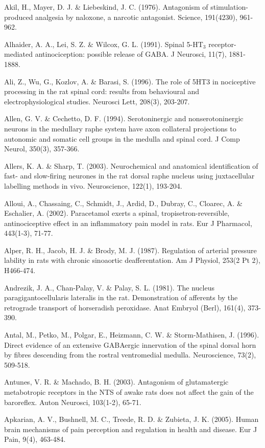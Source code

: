 \documentclass[a4paper,12pt,twoside]{report}
\begin{document}
\begin{singlespacing}
\begin{footnotesize}
Akil, H., Mayer, D. J. \& Liebeskind, J. C. (1976). Antagonism of stimulation-produced analgesia by naloxone, a narcotic antagonist. Science, 191(4230), 961-962.

Alhaider, A. A., Lei, S. Z. \& Wilcox, G. L. (1991). Spinal 5-HT$_{3}$ receptor-mediated antinociception: possible release of GABA. J Neurosci, 11(7), 1881-1888.

Ali, Z., Wu, G., Kozlov, A. \& Barasi, S. (1996). The role of 5HT3 in nociceptive processing in the rat spinal cord: results from behavioural and electrophysiological studies. Neurosci Lett, 208(3), 203-207.

Allen, G. V. \& Cechetto, D. F. (1994). Serotoninergic and nonserotoninergic neurons in the medullary raphe system have axon collateral projections to autonomic and somatic cell groups in the medulla and spinal cord. J Comp Neurol, 350(3), 357-366.

Allers, K. A. \& Sharp, T. (2003). Neurochemical and anatomical identification of fast- and slow-firing neurones in the rat dorsal raphe nucleus using juxtacellular labelling methods in vivo. Neuroscience, 122(1), 193-204.

Alloui, A., Chassaing, C., Schmidt, J., Ardid, D., Dubray, C., Cloarec, A. \& Eschalier, A. (2002). Paracetamol exerts a spinal, tropisetron-reversible, antinociceptive effect in an inflammatory pain model in rats. Eur J Pharmacol, 443(1-3), 71-77.

Alper, R. H., Jacob, H. J. \& Brody, M. J. (1987). Regulation of arterial pressure lability in rats with chronic sinoaortic deafferentation. Am J Physiol, 253(2 Pt 2), H466-474.

Andrezik, J. A., Chan-Palay, V. \& Palay, S. L. (1981). The nucleus paragigantocellularis lateralis in the rat. Demonstration of afferents by the retrograde transport of horseradish peroxidase. Anat Embryol (Berl), 161(4), 373-390.

Antal, M., Petko, M., Polgar, E., Heizmann, C. W. \& Storm-Mathisen, J. (1996). Direct evidence of an extensive GABAergic innervation of the spinal dorsal horn by fibres descending from the rostral ventromedial medulla. Neuroscience, 73(2), 509-518.

Antunes, V. R. \& Machado, B. H. (2003). Antagonism of glutamatergic metabotropic receptors in the NTS of awake rats does not affect the gain of the baroreflex. Auton Neurosci, 103(1-2), 65-71.

Apkarian, A. V., Bushnell, M. C., Treede, R. D. \& Zubieta, J. K. (2005). Human brain mechanisms of pain perception and regulation in health and disease. Eur J Pain, 9(4), 463-484.


\end{footnotesize}
\end{singlespacing}
\end{document}
